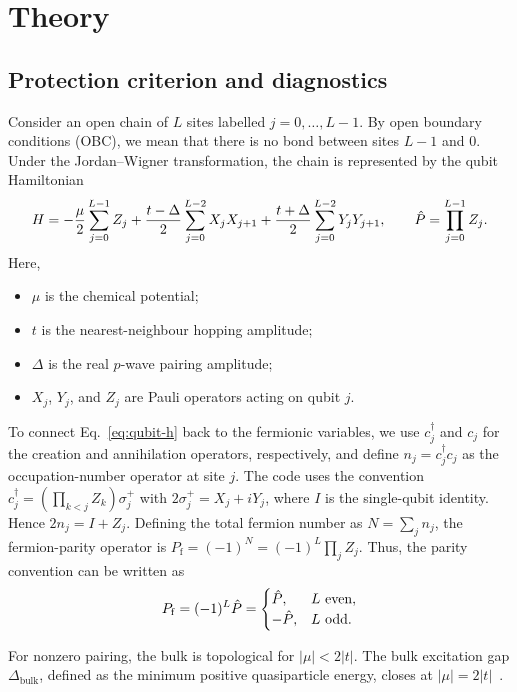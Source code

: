 \section{Theory}
\label{sec:theory}

\subsection{Protection criterion and diagnostics}

Consider an open chain of $L$ sites labelled $j=0,\ldots,L-1$.
By open boundary conditions (OBC), we mean that there is no bond between sites $L-1$ and $0$.
Under the Jordan--Wigner transformation, the chain is represented by the qubit
Hamiltonian
\begin{equation}
 H=-\frac{\mu}{2}\sum_{j=0}^{L-1}Z_j
 +\frac{t-\Delta}{2}\sum_{j=0}^{L-2}X_jX_{j+1}
 +\frac{t+\Delta}{2}\sum_{j=0}^{L-2}Y_jY_{j+1},
 \qquad \hat{P}=\prod_{j=0}^{L-1}Z_j .
 \label{eq:qubit-h}
\end{equation}
Here,
\begin{itemize}
  \item $\mu$ is the chemical potential;
  \item $t$ is the nearest-neighbour hopping amplitude;
  \item $\Delta$ is the real $p$-wave pairing amplitude;
  \item $X_j$, $Y_j$, and $Z_j$ are Pauli operators acting on qubit $j$.
\end{itemize}


To connect Eq.~\eqref{eq:qubit-h} back to the fermionic variables,
we use $c_j^\dagger$ and $c_j$ for the creation and annihilation operators, respectively, and define
$n_j=c_j^\dagger c_j$ as the occupation-number operator at site $j$.
The code uses the convention
$c_j^\dagger=(\prod_{k<j}Z_k)\sigma_j^+$ with
$2\sigma_j^+=X_j+iY_j$, where $I$ is the single-qubit identity. Hence
$2n_j=I+Z_j$. Defining the total fermion number as $N=\sum_j n_j$, the
fermion-parity operator is
$P_{\mathrm f}=(-1)^N=(-1)^L\prod_j Z_j$.
Thus, the parity convention can be written as
$$P_{\mathrm f}=(-1)^L\hat{P}=
\begin{cases}
\hat{P}, & L\ \text{even},\\
-\hat{P}, & L\ \text{odd}.
\end{cases}$$

For nonzero pairing, the bulk is topological for $|\mu|<2|t|$. The bulk excitation gap
$\Delta_{\mathrm{bulk}}$, defined as the minimum positive quasiparticle energy,
closes at $|\mu|=2|t|$~\cite{kitaev2001}.

